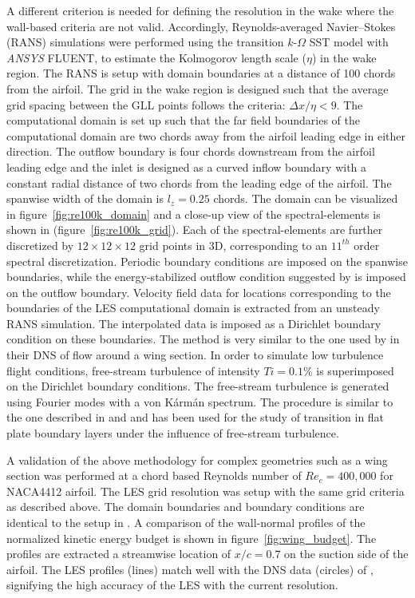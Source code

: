 A different criterion is needed for defining the resolution in the wake where the wall-based criteria are not valid. Accordingly, Reynolds-averaged Navier--Stokes (RANS) simulations were performed using the transition $k$-$\Omega$ SST model with \textit{ANSYS}\textsuperscript{\textregistered} FLUENT, to estimate the Kolmogorov length scale ($\eta$) in the wake region. The RANS is setup with domain boundaries at a distance of 100 chords from the airfoil. The grid in the wake region is designed such that the average grid spacing between the GLL points follows the criteria: $\Delta x/\eta < 9$. The computational domain is set up such that the far field boundaries of the computational domain are two chords away from the airfoil leading edge in either direction. The outflow boundary is four chords downstream from the airfoil leading edge and the inlet is designed as a curved inflow boundary with a constant radial distance of two chords from the leading edge of the airfoil. The spanwise width of the domain is $l_{z}=0.25$ chords. The domain can be visualized in figure~\ref{fig:re100k_domain} and a close-up view of the spectral-elements is shown in (figure~\ref{fig:re100k_grid}). Each of the spectral-elements are further discretized by $12\times12\times12$ grid points in 3D, corresponding to an $11^{th}$ order spectral discretization. Periodic boundary conditions are imposed on the spanwise boundaries, while the energy-stabilized outflow condition suggested by \cite{dong2014} is imposed on the outflow boundary. Velocity field data for locations corresponding to the boundaries of the LES computational domain is extracted from an unsteady RANS simulation. The interpolated data is imposed as a Dirichlet boundary condition on these boundaries. The method is very similar to the one used by \cite{hosseini16} in their DNS of flow around a wing section. In order to simulate low turbulence flight conditions, free-stream turbulence of intensity $Ti=0.1\%$ is superimposed on the Dirichlet boundary conditions. The free-stream turbulence is generated using Fourier modes with a von K\'arm\'an spectrum. The procedure is similar to the one described in \cite{schlatterdiploma,brandt04} and \cite{schlatter08} and has been used for the study of transition in flat plate boundary layers under the influence of free-stream turbulence.  

A validation of the above methodology for complex geometries such as a wing section was performed at a chord based Reynolds number of $Re_{c}=400,000$ for NACA4412 airfoil. The LES grid resolution was setup with the same grid criteria as described above. The domain boundaries and boundary conditions are identical to the setup in \cite{hosseini16}. A comparison of the wall-normal profiles of the normalized kinetic energy budget is shown in figure~\ref{fig:wing_budget}. The profiles are extracted a streamwise location of $x/c=0.7$ on the suction side of the airfoil. The LES profiles (lines) match well with the DNS data (circles) of \cite{hosseini16}, signifying the high accuracy of the LES with the current resolution.

